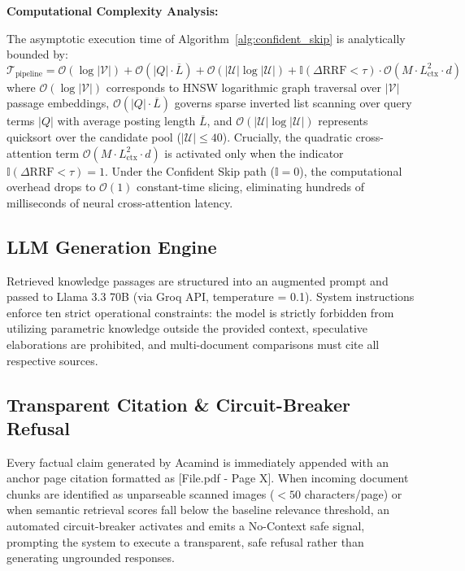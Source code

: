\documentclass[10pt]{SPIIRAS_Proceedings}
\begin{document}
\smallskip
\noindent\textbf{Computational Complexity Analysis:}\par
The asymptotic execution time of Algorithm~\ref{alg:confident_skip} is analytically bounded by:
\begin{equation}
\mathcal{T}_{\text{pipeline}} = \mathcal{O}(\log |\mathcal{V}|) + \mathcal{O}(|Q| \cdot \overline{L}) + \mathcal{O}(|\mathcal{U}| \log |\mathcal{U}|) + \mathbb{I}(\Delta \text{RRF} < \tau) \cdot \mathcal{O}(M \cdot L_{\text{ctx}}^2 \cdot d)
\end{equation}
where $\mathcal{O}(\log |\mathcal{V}|)$ corresponds to HNSW logarithmic graph traversal over $|\mathcal{V}|$ passage embeddings, $\mathcal{O}(|Q| \cdot \overline{L})$ governs sparse inverted list scanning over query terms $|Q|$ with average posting length $\overline{L}$, and $\mathcal{O}(|\mathcal{U}| \log |\mathcal{U}|)$ represents quicksort over the candidate pool ($|\mathcal{U}| \le 40$). Crucially, the quadratic cross-attention term $\mathcal{O}(M \cdot L_{\text{ctx}}^2 \cdot d)$ is activated only when the indicator $\mathbb{I}(\Delta \text{RRF} < \tau) = 1$. Under the Confident Skip path ($\mathbb{I}=0$), the computational overhead drops to $\mathcal{O}(1)$ constant-time slicing, eliminating hundreds of milliseconds of neural cross-attention latency.

\subsection{LLM Generation Engine}
Retrieved knowledge passages are structured into an augmented prompt and passed to Llama 3.3 70B (via Groq API, temperature = 0.1). System instructions enforce ten strict operational constraints: the model is strictly forbidden from utilizing parametric knowledge outside the provided context, speculative elaborations are prohibited, and multi-document comparisons must cite all respective sources.

\subsection{Transparent Citation \& Circuit-Breaker Refusal}
Every factual claim generated by Acamind is immediately appended with an anchor page citation formatted as [File.pdf - Page X]. When incoming document chunks are identified as unparseable scanned images ($<50$ characters/page) or when semantic retrieval scores fall below the baseline relevance threshold, an automated circuit-breaker activates and emits a No-Context safe signal, prompting the system to execute a transparent, safe refusal rather than generating ungrounded responses.
\end{document}
